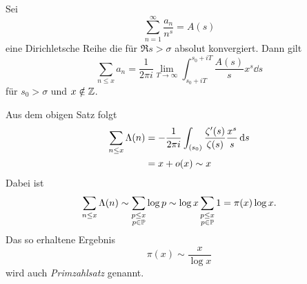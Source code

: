 
\begin{theorem}
    Sei
    $$ \sum_{n=1}^\infty \frac{a_n}{n^s} = A(s) $$
    eine Dirichletsche Reihe die für $\Re s > \sigma$ absolut konvergiert. Dann gilt
    $$ \sum_{n \leq x} a_n = \frac{1}{2 \pi i} \lim_{T \to \infty} \int_{s_0 + iT}^{s_0 + iT} \frac{A(s)}{s} x^s \dd s $$
    für $s_0 > \sigma$ und $x \notin \Z$.
\end{theorem}

\begin{remark}
    Aus dem obigen Satz folgt
    \begin{align*}
        \sum_{n \leq x} \Lambda(n) &= -\frac{1}{2 \pi i} \int_{(s_0)} \frac{\zeta'(s)}{\zeta(s)} \frac{x^s}{s} \dd s \\
        &= x + \o(x) \sim x
    \end{align*}
    Dabei ist
    $$ \sum_{n \leq x} \Lambda(n) \sim \sum_{\substack{p \leq x \\ p \in \P}} \log p \sim \log x \sum_{\substack{p \leq x \\ p \in \P}} 1 = \pi(x) \log x. $$
    Das so erhaltene Ergebnis
    $$ \pi(x) \sim \frac{x}{\log x} $$
    wird auch \emph{Primzahlsatz} genannt.
\end{remark}